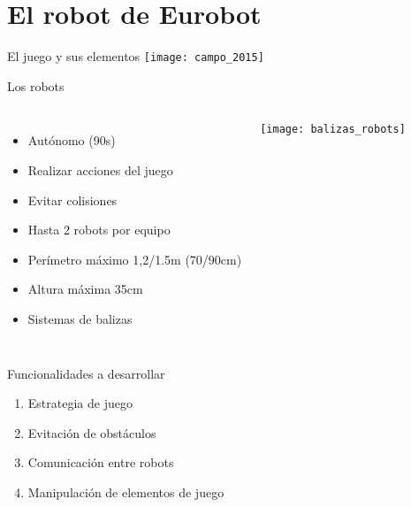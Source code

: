 \documentclass{beamer}
\begin{document}
\section{El robot de Eurobot}

\begin{frame}{El juego y sus elementos}
\texttt{[image: campo\_2015]}
\end{frame}

\begin{frame}{Los robots}
\begin{columns}

\begin{itemize}
\item Autónomo (90s)
\item Realizar acciones del juego
\item Evitar colisiones
\item Hasta 2 robots por equipo
\item Perímetro máximo 1,2/1.5m (70/90cm)
\item Altura máxima 35cm
\item Sistemas de balizas
\end{itemize}

\centering
\texttt{[image: balizas\_robots]}
\end{columns}
\end{frame}



\begin{frame}{Funcionalidades a desarrollar}

 {
	\begin{enumerate}
	\item Estrategia de juego
	\item Evitación de obstáculos
	\item Comunicación entre robots
	\item Manipulación de elementos de juego
	\end{enumerate}
}{}

\end{frame}
\end{document}

